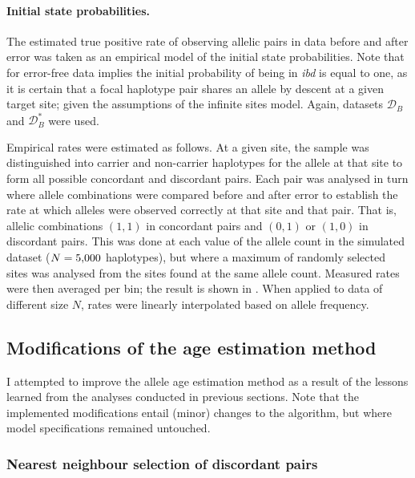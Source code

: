 \paragraph{Initial state probabilities.}
The estimated true positive rate of observing allelic pairs in data before and after error was taken as an empirical model of the initial state probabilities.
Note that for error-free data implies the initial probability of being in \emph{ibd} is equal to one, as it is certain that a focal haplotype pair shares an allele by descent at a given target site; given the assumptions of the infinite sites model.
Again, datasets $\mathcal{D}_B$ and $\mathcal{D}_B^{\ast}$ were used.

%

%

Empirical rates were estimated as follows.
At a given site, the sample was distinguished into carrier and non-carrier haplotypes for the allele at that site to form all possible concordant and discordant pairs.
Each pair was analysed in turn where allele combinations were compared before and after error to establish the rate at which alleles were observed correctly at that site and that pair.
That is, allelic combinations $(1,1)$ in concordant pairs and $(0,1)$ or $(1,0)$ in discordant pairs.
This was done at each value of the allele count in the simulated dataset ($N=\n{5000}$ haplotypes), but where a maximum of  randomly selected sites was analysed from the sites found at the same allele count.
Measured rates were then averaged per bin; the result is shown in .
When applied to data of different size $N$, rates were linearly interpolated based on allele frequency.






%
\subsection{Modifications of the age estimation method}\label{sec:age_method_mod}
%

I attempted to improve the allele age estimation method as a result of the lessons learned from the analyses conducted in previous sections.
Note that the implemented modifications entail (minor) changes to the algorithm, but where model specifications remained untouched.

%
\subsubsection{Nearest neighbour selection of discordant pairs}
%

